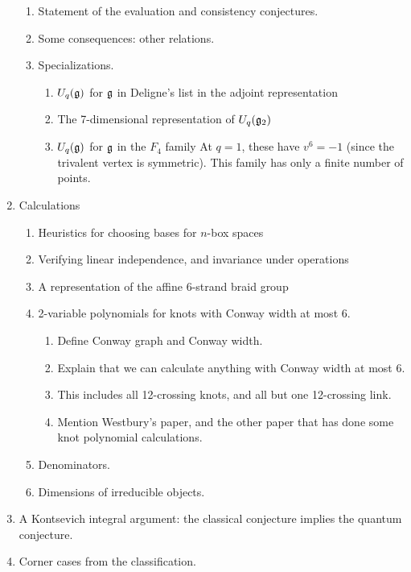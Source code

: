 \documentclass[12pt]{amsart}
\begin{document}
\begin{enumerate}
\begin{enumerate}
\item Statement of the evaluation and consistency conjectures.
\item Some consequences: other relations.
\item Specializations.
  \begin{enumerate}
  \item $U_q({\mathfrak g})$ for ${\mathfrak g}$ in Deligne's list in the adjoint
    representation
  \item The 7-dimensional representation of $U_q({\mathfrak g}_2)$
  \item $U_q({\mathfrak g})$ for ${\mathfrak g}$ in the $F_4$ family
    At $q=1$, these have $v^6=-1$ (since the trivalent vertex is
    symmetric). This family has only a finite number of points.
  \end{enumerate}
\end{enumerate}
\item Calculations
\begin{enumerate}
\item Heuristics for choosing bases for $n$-box spaces
\item Verifying linear independence, and invariance under operations
\item A representation of the affine 6-strand braid group
\item 2-variable polynomials for knots with Conway width at most 6.
\begin{enumerate}
\item Define Conway graph and Conway width.
\item Explain that we can calculate anything with Conway width at most 6.
\item This includes all 12-crossing knots, and all but one 12-crossing link.
\item Mention Westbury's paper, and the other paper that has done some knot
polynomial calculations.
\end{enumerate}
\item Denominators.
\item Dimensions of irreducible objects.
\end{enumerate}
\item A Kontsevich integral argument: the classical conjecture implies the
quantum conjecture.
\item Corner cases from the classification.
\end{enumerate}
\end{document}
